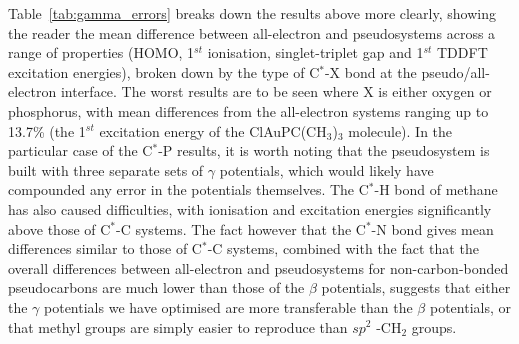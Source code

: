 \documentclass[aip,reprint,nofootinbib]{revtex4-1}
\begin{document}
Table~\ref{tab:gamma_errors} breaks down the results above more clearly, showing the reader the mean difference between all-electron and pseudosystems across a range of properties (HOMO, 1$^{st}$ ionisation, singlet-triplet gap and 1$^{st}$ TDDFT excitation energies), broken down by the type of C$^\ast$-X bond at the pseudo/all-electron interface. The worst results are to be seen where X is either oxygen or phosphorus, with mean differences from the all-electron systems ranging up to 13.7\% (the 1$^{st}$ excitation energy of the ClAuPC(CH$_3$)$_3$ molecule). In the particular case of the C$^\ast$-P results, it is worth noting that the pseudosystem is built with three separate sets of $\gamma$ potentials, which would likely have compounded any error in the potentials themselves. The C$^\ast$-H bond of methane has also caused difficulties, with ionisation and excitation energies significantly above those of C$^\ast$-C systems. The fact however that the C$^\ast$-N bond gives mean differences similar to those of C$^\ast$-C systems, combined with the fact that the overall differences between all-electron and pseudosystems for non-carbon-bonded pseudocarbons are much lower than those of the $\beta$ potentials, suggests that either the $\gamma$ potentials we have optimised are more transferable than the $\beta$ potentials, or that methyl groups are simply easier to reproduce than $sp^2$ -CH$_2$ groups.
\end{document}
